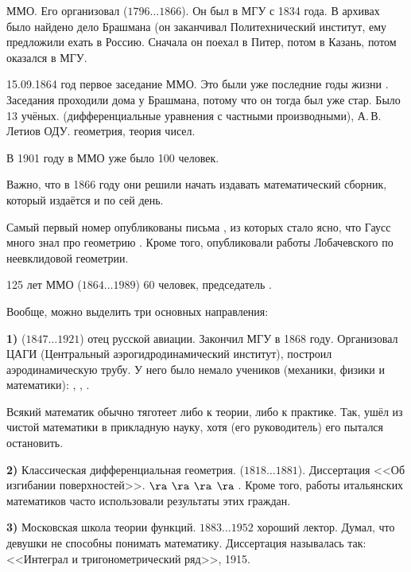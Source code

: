 \documentclass[a4paper,oneside,fleqn,10pt]{article}
\newcommand{\pe}[2]{${#1}\ldots{#2}$}
\begin{document}
ММО. Его организовал  (\pe{1796}{1866}).  Он был
в МГУ с 1834 года.  В архивах было найдено дело Брашмана (он
заканчивал Политехнический институт, ему предложили ехать в
Россию. Сначала он поехал в Питер, потом в Казань, потом оказался в
МГУ.

15.09.1864 год первое заседание ММО. Это были уже последние годы жизни
.  Заседания проходили дома у Брашмана,
потому что он тогда был уже стар.  Было 13
учёных.  (дифференциальные уравнения с частными
производными), А.\,В.\,Летиов ОДУ.  геометрия,
 теория чисел.

В 1901 году в ММО уже было 100 человек.

Важно, что в 1866 году они решили начать издавать математический
сборник, который издаётся и по сей день.

Самый первый номер опубликованы письма 
, из которых стало ясно, что Гаусс много знал
про геометрию . Кроме того,
опубликовали работы Лобачевского по неевклидовой геометрии.

125 лет ММО (\pe{1864}{1989}) 60 человек, председатель
.

Вообще, можно выделить три основных направления:

\textbf{1)}  (\pe{1847}{1921}) отец русской
авиации.  Закончил МГУ в 1868 году. Организовал \hbox{ЦАГИ}
(Центральный аэрогидродинамический институт), построил
аэродинамическую трубу.  У него было немало учеников (механики, физики
и математики): , ,
.

Всякий математик обычно тяготеет либо к теории, либо к практике.  Так,
 ушёл из чистой математики в прикладную науку, хотя
 (его руководитель) его пытался остановить.

\textbf{2)} Классическая дифференциальная
геометрия.  (\pe{1818}{1881}).  Диссертация <<Об
изгибании поверхностей>>.   $\ra$  $\ra$
 $\ra$  $\ra$ .  Кроме
того, работы итальянских математиков часто использовали результаты
этих граждан.

\textbf{3)} Московская школа теории функций.   \pe{1883}{1952} хороший
лектор.  Думал, что девушки не способны понимать математику.
Диссертация  называлась так: <<Интеграл и
тригонометрический ряд>>, 1915.
\end{document}
